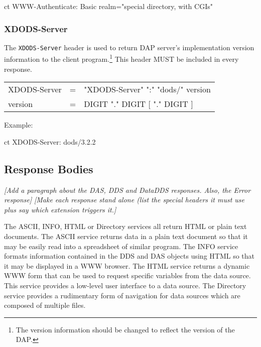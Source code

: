 \documentclass{article}
\begin{document}
\begin{vcode}{ct}
WWW-Authenticate: Basic realm="special directory, with CGIs"
\end{vcode}

\subsubsection{XDODS-Server}
The \texttt{XDODS-Server} header is used to return \ac{DAP} server's
implementation version information to the client program.\footnote{The
  version information should be changed to reflect the version of the
  \ac{DAP}.} This header MUST be included in every response.

\begin{ttfamily}
\begin{center}
\begin{tabular}{lll}
XDODS-Server & = & "XDODS-Server" ":" "dods/" version \\
version & = & DIGIT "." DIGIT [ "." DIGIT ]
\end{tabular}
\end{center}
\end{ttfamily}

Example:
\begin{vcode}{ct}
XDODS-Server: dods/3.2.2
\end{vcode}

\subsection{Response Bodies}
\label{sec:resp-bodies}

\emph{[Add a paragraph about the DAS, DDS and DataDDS responses. Also, the
  Error response]}
\emph{[Make each response stand alone (list the special headers it must use
  plus say which extension triggers it.]}

The ASCII, INFO, HTML or Directory services all return \ac{HTML} or plain
text documents. The ASCII service returns data in a plain text document so
that it may be easily read into a spreadsheet of similar program. The INFO
service formats information contained in the \ac{DDS} and \ac{DAS} objects
using \ac{HTML} so that it may be displayed in a \ac{WWW} browser. The HTML
service returns a dynamic \ac{WWW} form that can be used to request specific
variables from the data source. This service provides a low-level user
interface to a data source. The Directory service provides a rudimentary form
of navigation for data sources which are composed of multiple files.
\end{document}
